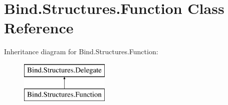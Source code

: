 \hypertarget{class_bind_1_1_structures_1_1_function}{
\section{Bind.Structures.Function Class Reference}
\label{class_bind_1_1_structures_1_1_function}
}
Inheritance diagram for Bind.Structures.Function:\begin{figure}[H]
\begin{center}
\leavevmode
\includegraphics[height=2.000000cm]{class_bind_1_1_structures_1_1_function}
\end{center}
\end{figure}
